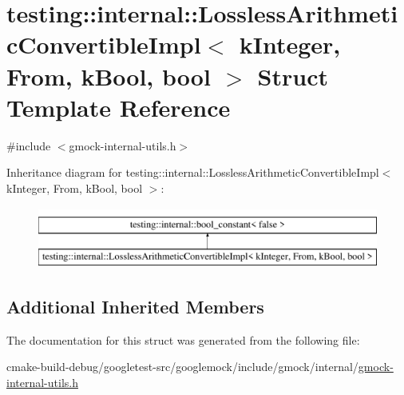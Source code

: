 \hypertarget{structtesting_1_1internal_1_1LosslessArithmeticConvertibleImpl_3_01kInteger_00_01From_00_01kBool_00_01bool_01_4}{}\section{testing\+::internal\+::Lossless\+Arithmetic\+Convertible\+Impl$<$ k\+Integer, From, k\+Bool, bool $>$ Struct Template Reference}
\label{structtesting_1_1internal_1_1LosslessArithmeticConvertibleImpl_3_01kInteger_00_01From_00_01kBool_00_01bool_01_4}


{\ttfamily \#include $<$gmock-\/internal-\/utils.\+h$>$}

Inheritance diagram for testing\+::internal\+::Lossless\+Arithmetic\+Convertible\+Impl$<$ k\+Integer, From, k\+Bool, bool $>$\+:\begin{figure}[H]
\begin{center}
\leavevmode
\includegraphics[height=2.000000cm]{structtesting_1_1internal_1_1LosslessArithmeticConvertibleImpl_3_01kInteger_00_01From_00_01kBool_00_01bool_01_4}
\end{center}
\end{figure}
\subsection*{Additional Inherited Members}


The documentation for this struct was generated from the following file\+:\begin{DoxyCompactItemize}
\item 
cmake-\/build-\/debug/googletest-\/src/googlemock/include/gmock/internal/\mbox{\hyperlink{gmock-internal-utils_8h}{gmock-\/internal-\/utils.\+h}}\end{DoxyCompactItemize}
